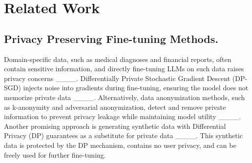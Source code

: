 \section{Related Work}
\subsection{Privacy Preserving Fine-tuning Methods.}
Domain-specific data, such as medical diagnoses and financial reports, often contain sensitive information, and directly fine-tuning LLMs on such data raises privacy concerns ____. 
Differentially Private Stochastic Gradient Descent (DP-SGD) injects noise into gradients during fine-tuning, ensuring the model does not memorize private data ____. 
Alternatively, data anonymization methods, such as k-anonymity and adversarial anonymization, detect and remove private information to prevent privacy leakage while maintaining model utility ____. 
Another promising approach is generating synthetic data with Differential Privacy (DP) guarantees as a substitute for private data ____. This synthetic data is protected by the DP mechanism, contains no user privacy, and can be freely used for further fine-tuning.



